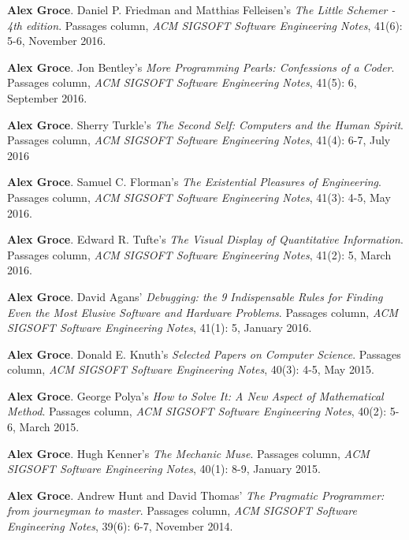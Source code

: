 \documentclass[ComputerScience]{vita}
\begin{document}
\begin{vita}
\begin{Columns, Book Reviews, and Magazine Articles}
\item {\bf Alex Groce}.
\newblock Daniel P. Friedman and Matthias Felleisen's \emph{The Little Schemer - 4th edition}.
\newblock Passages column, \emph{ACM SIGSOFT Software Engineering Notes}, 41(6): 5-6, November 2016.

\item {\bf Alex Groce}.
\newblock Jon Bentley's \emph{More Programming Pearls: Confessions of a Coder}.
\newblock Passages column, \emph{ACM SIGSOFT Software Engineering Notes}, 41(5): 6, September 2016.

\item {\bf Alex Groce}.
\newblock Sherry Turkle's \emph{The Second Self: Computers and the Human Spirit}.
\newblock Passages column, \emph{ACM SIGSOFT Software Engineering Notes}, 41(4): 6-7, July 2016

\item {\bf Alex Groce}.
\newblock Samuel C. Florman's \emph{The Existential Pleasures of Engineering}.
\newblock Passages column, \emph{ACM SIGSOFT Software Engineering Notes}, 41(3): 4-5, May 2016.


\item {\bf Alex Groce}.
\newblock Edward R. Tufte's \emph{The Visual Display of Quantitative Information}.
\newblock Passages column, \emph{ACM SIGSOFT Software Engineering Notes}, 41(2): 5, March 2016.

\item {\bf Alex Groce}.
\newblock David Agans' \emph{Debugging: the 9 Indispensable Rules for Finding Even the Most Elusive Software and Hardware Problems}. 
\newblock Passages column, \emph{ACM SIGSOFT Software Engineering Notes}, 41(1): 5, January 2016.


\item {\bf Alex Groce}.
\newblock Donald E. Knuth's \emph{Selected Papers on Computer Science}.
\newblock Passages column, \emph{ACM SIGSOFT Software Engineering Notes}, 40(3): 4-5, May 2015.

\item{\bf Alex Groce}.
\newblock George Polya's \emph{How to Solve It: A New Aspect of Mathematical Method}.
\newblock Passages column, \emph{ACM SIGSOFT Software Engineering Notes}, 40(2): 5-6, March 2015.

\item {\bf Alex Groce}.
\newblock Hugh Kenner's \emph{The Mechanic Muse}.
\newblock Passages column, \emph{ACM SIGSOFT Software Engineering Notes}, 40(1): 8-9, January 2015.

\item {\bf Alex Groce}.
\newblock Andrew Hunt and David Thomas' \emph{The Pragmatic Programmer: from journeyman to master}.
\newblock Passages column, \emph{ACM SIGSOFT Software Engineering Notes}, 39(6): 6-7, November 2014.


\end{Columns, Book Reviews, and Magazine Articles}
\end{vita}
\end{document}
